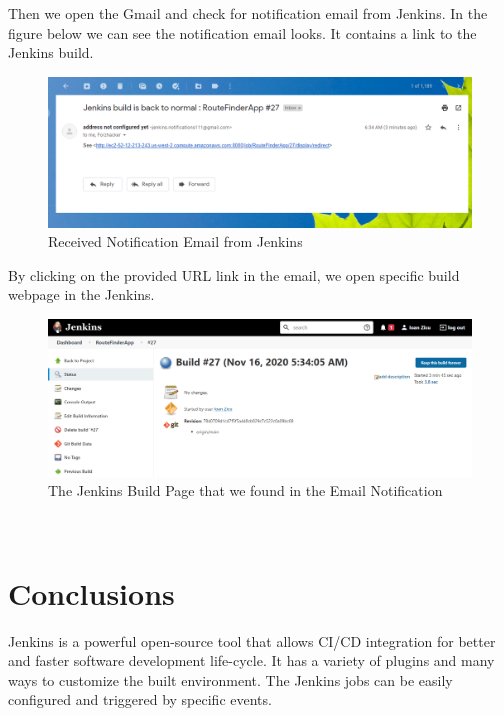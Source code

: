 \documentclass[12pt,a4paper,twoside]{article}
\begin{document}
Then we open the Gmail and check for notification email from Jenkins. 
In the figure below we can see the notification email looks. It contains a link to the Jenkins build.


\begin{figure}[H]
    \centering
        \includegraphics[width=15cm]{images-aws/58-gmail-notification-received-full.png}
        \caption{Received Notification Email from Jenkins}
\end{figure}


By clicking on the provided URL link in the email, we open specific build webpage in the Jenkins.


\begin{figure}[H]
    \centering
        \includegraphics[width=15cm]{images-aws/59-gmail-notification-link-open.png}
        \caption{The Jenkins Build Page that we found in the Email Notification}
\end{figure}






~\newpage


\section{Conclusions}

Jenkins is a powerful open-source tool that allows CI/CD integration for better and faster software development life-cycle. It has a variety of plugins and many ways to customize the built environment. The Jenkins jobs can be easily configured and triggered by specific events. 
\end{document}

